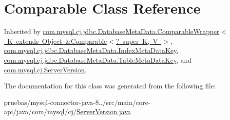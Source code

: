\hypertarget{class_comparable}{}\section{Comparable Class Reference}
\label{class_comparable}


Inherited by \mbox{\hyperlink{classcom_1_1mysql_1_1cj_1_1jdbc_1_1_database_meta_data_1_1_comparable_wrapper}{com.\+mysql.\+cj.\+jdbc.\+Database\+Meta\+Data.\+Comparable\+Wrapper$<$ K extends Object \&\+Comparable$<$? super K, V $>$}}, \mbox{\hyperlink{classcom_1_1mysql_1_1cj_1_1jdbc_1_1_database_meta_data_1_1_index_meta_data_key}{com.\+mysql.\+cj.\+jdbc.\+Database\+Meta\+Data.\+Index\+Meta\+Data\+Key}}, \mbox{\hyperlink{classcom_1_1mysql_1_1cj_1_1jdbc_1_1_database_meta_data_1_1_table_meta_data_key}{com.\+mysql.\+cj.\+jdbc.\+Database\+Meta\+Data.\+Table\+Meta\+Data\+Key}}, and \mbox{\hyperlink{classcom_1_1mysql_1_1cj_1_1_server_version}{com.\+mysql.\+cj.\+Server\+Version}}.



The documentation for this class was generated from the following file\+:\begin{DoxyCompactItemize}
\item 
pruebas/mysql-\/connector-\/java-\/8../src/main/core-\/api/java/com/mysql/cj/\mbox{\hyperlink{_server_version_8java}{Server\+Version.\+java}}\end{DoxyCompactItemize}
